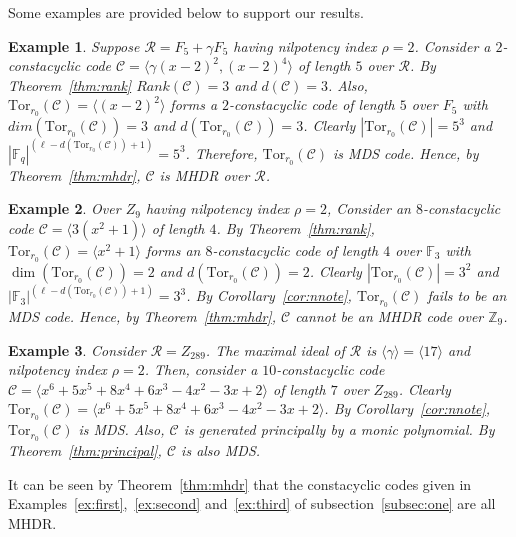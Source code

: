 \documentclass[12pt,a4paper]{article}
\newtheorem{example}{Example}
\begin{document}
Some examples are provided below to support our results.
\begin{example}\label{ex:fourth}
    Suppose $\mathcal{R}=F_5+\gamma F_5$ having nilpotency index $\rho=2$. Consider a $2$-constacyclic code $\mathcal{C}=\langle \gamma (x-2)^2,(x-2)^4 \rangle$ of length $5$ over $\mathcal{R}$. By Theorem~\ref{thm:rank} $Rank(\mathcal{C})=3$ and $d(\mathcal{C})=3$. Also, $\mathrm{Tor}_{r_0}(\mathcal{C})= \langle (x-2)^2 \rangle$ forms a $2$-constacyclic code of length $5$ over $F_5$ with $dim(\mathrm{Tor}_{r_0}(\mathcal{C}))=3$ and $d(\mathrm{Tor}_{r_0}(\mathcal{C}))=3$. Clearly $|\mathrm{Tor}_{r_0}(\mathcal{C})|=5^3$ and $|\mathbb{F}_q|^{(\ell-d(\mathrm{Tor}_{r_0}(\mathcal{C}))+1)}=5^3$. Therefore, $\mathrm{Tor}_{r_0}(\mathcal{C})$ is MDS code. Hence, by Theorem~\ref{thm:mhdr}, $\mathcal{C}$ is MHDR over $\mathcal{R}$.
\end{example}

\begin{example}\label{ex:fifth}
   Over $Z_9$ having nilpotency index $\rho=2$, Consider an $8$-constacyclic code $\mathcal{C}=\langle 3(x^2+1)\rangle$ of length $4$. By Theorem~\ref{thm:rank}, $\mathrm{Tor}_{r_0}(\mathcal{C})=\langle x^2+1\rangle$ forms an $8$-constacyclic code of length $4$ over $\mathbb{F}_3$ with $\dim(\mathrm{Tor}_{r_0}(\mathcal{C}))=2$ and $d(\mathrm{Tor}_{r_0}(\mathcal{C}))=2$. Clearly $|\mathrm{Tor}_{r_0}(\mathcal{C})|=3^2$ and $|\mathbb{F}_3|^{(\ell-d(\mathrm{Tor}_{r_0}(\mathcal{C}))+1)}=3^3$. By Corollary~\ref{cor:nnote}, $\mathrm{Tor}_{r_0}(\mathcal{C})$ fails to be an MDS code. Hence, by Theorem~\ref{thm:mhdr}, $\mathcal{C}$ cannot be an MHDR code over $\mathbb{Z}_9$.

\end{example}
\begin{example}
     Consider $\mathcal{R}=Z_{289}$. The maximal ideal of $\mathcal{R}$ is $\langle\gamma\rangle=\langle17\rangle$ and nilpotency index $\rho=2$. Then, consider a $10$-constacyclic code $\mathcal{C}=\langle x^6+5x^5+8x^4+6x^3-4x^2-3x+2\rangle$ of length $7$ over $Z_{289}$. Clearly $\mathrm{Tor}_{r_0}(\mathcal{C})=\langle x^6+5x^5+8x^4+6x^3-4x^2-3x+2\rangle$. By Corollary~\ref{cor:nnote}, $\mathrm{Tor}_{r_0}(\mathcal{C})$ is MDS. Also, $\mathcal{C}$ is generated principally by a monic polynomial. By Theorem~\ref{thm:principal}, $\mathcal{C}$ is also MDS.
\end{example}
It can be seen by Theorem~\ref{thm:mhdr} that the constacyclic codes given in Examples~\ref{ex:first},~\ref{ex:second} and~\ref{ex:third} of subsection~\ref{subsec:one} are all MHDR.
\end{document}
